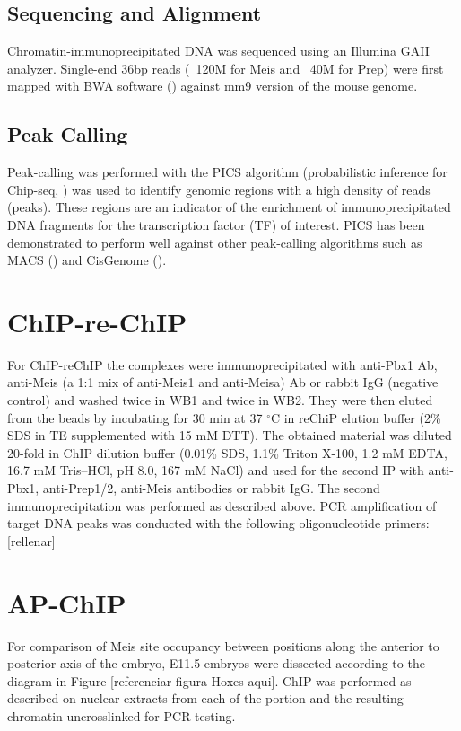 \subsection{Sequencing and Alignment}

Chromatin-immunoprecipitated DNA was sequenced using an Illumina GAII analyzer. Single-end 36bp reads (~120M for Meis and ~40M for Prep) were first mapped with BWA software (\cite{Li2009}) against mm9 version of the mouse genome.

\subsection{Peak Calling}

Peak-calling was performed with the PICS algorithm (probabilistic inference for Chip-seq, \cite{Zhang2011}) was used to identify genomic regions with a high density of reads (peaks). These regions are an indicator of the enrichment of immunoprecipitated DNA fragments for the transcription factor (TF) of interest. PICS has been demonstrated to perform well against other peak-calling algorithms such as MACS (\cite{Zhang2008}) and CisGenome (\cite{Ji2011}).

\section{ChIP-re-ChIP}

For ChIP-reChIP the complexes were immunoprecipitated with anti-Pbx1 Ab, anti-Meis (a 1:1 mix of anti-Meis1 and anti-Meisa) Ab or rabbit IgG (negative control) and washed twice in WB1 and twice in WB2. They were then eluted from the beads by incubating for 30 min at 37 $^\circ$C in reChiP elution buffer (2\% SDS in TE supplemented with 15 mM DTT). The obtained material was diluted 20-fold in ChIP dilution buffer (0.01\% SDS, 1.1\% Triton X-100, 1.2 mM EDTA, 16.7 mM Tris–HCl, pH 8.0, 167 mM NaCl) and used for the second IP with anti-Pbx1, anti-Prep1/2, anti-Meis antibodies or rabbit IgG. The second immunoprecipitation was performed as described above. PCR amplification of target DNA peaks was conducted with the following oligonucleotide primers: [rellenar]

\section{AP-ChIP}

For comparison of Meis site occupancy between positions along the anterior to posterior axis of the embryo, E11.5 embryos were dissected according to the diagram in  Figure [referenciar figura Hoxes aqui]. ChIP was performed as described on nuclear extracts from each of the portion and the resulting chromatin uncrosslinked for PCR testing.

